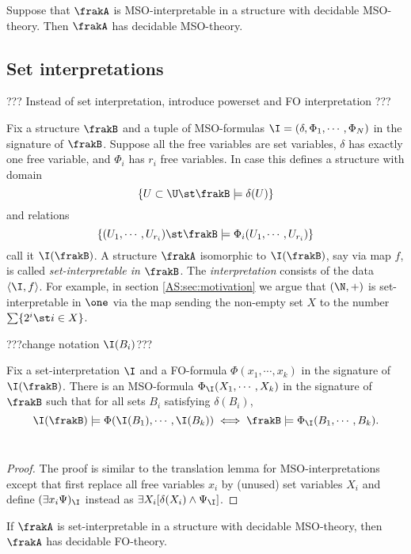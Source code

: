 \begin{proposition}
Suppose that $\frakA$ is MSO-interpretable in a structure with decidable MSO-theory. Then $\frakA$ has decidable MSO-theory.
\end{proposition}

\subsection{Set interpretations}

??? Instead of set interpretation, introduce powerset and FO interpretation ???

Fix a structure $\frakB$ and a tuple of MSO-formulas $\I = (\delta, \Phi_1, \cdots, \Phi_N)$ in the signature of $\frakB$.
Suppose all the free variables are set variables, $\delta$ has exactly one free variable, and $\Phi_i$ has $r_i$ free variables.
In case this defines a structure with domain 
\[
\{U \subset \U \st \frakB \models \delta(U)\}
\]
and relations
\[
\{(U_1,\cdots,U_{r_i}) \st \frakB \models \Phi_i(U_1,\cdots,U_{r_i})\}
\]
call it  $\I(\frakB)$.
A structure $\frakA$ isomorphic to $\I(\frakB)$, say via map $f$, is called {\em
set-interpretable in $\frakB$}. The {\em interpretation} consists of the data $\left<\I,f\right>$.
For example, in section \ref{AS:sec:motivation} we argue that $(\N,+)$ is set-interpretable in
$\one$ via the map sending the non-empty set $X$ to the number $\sum\{2^i \st i \in X\}$.

???change notation $\I(B_i)$???
\begin{lemma}
Fix a set-interpretation $\I$ and a FO-formula $\Phi(x_1,\cdots,x_k)$ in the signature of $\I(\frakB)$.
There is an MSO-formula $\Phi_\I(X_1,\cdots,X_k)$ in the signature of $\frakB$ such that for all sets $B_i$ satisfying $\delta(B_i)$,
\[
\I(\frakB) \models \Phi(\I(B_1),\cdots,\I(B_k))  \iff 
\frakB \models \Phi_\I(B_1,\cdots,B_k). 
\]
\
\end{lemma}

\begin{proof}
The proof is similar to the translation lemma for MSO-interpretations except that first replace all free variables $x_i$ by (unused) 
set variables $X_i$ and define $(\exists x_i \Psi)_\I$ instead as
$\exists X_i [ \delta(X_i) \wedge \Psi_\I]$.
\end{proof}

\begin{proposition}
If $\frakA$ is set-interpretable in a structure with decidable MSO-theory, then $\frakA$ has decidable FO-theory.
\end{proposition}


